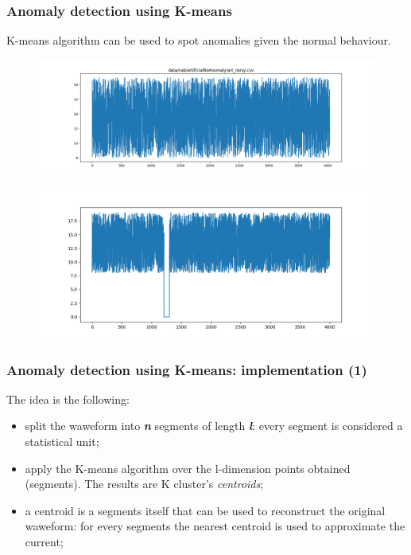 \documentclass[xcolor ={table,usenames,dvipsnames}]{beamer}
\theoremstyle{definition}
\begin{document}
	\begin{frame}[fragile]
		\frametitle{Anomaly detection using K-means}
		K-means algorithm can be used to spot anomalies given the normal behaviour.
			\begin{figure}[]
			\centering
			\includegraphics[scale=0.15]{img/normalbe.png}
		\end{figure}
		
		\begin{figure}[]
			\centering
			\includegraphics[scale=0.20]{img/anomaly.png}
		\end{figure}
	
	\end{frame}

	\begin{frame}
		\frametitle{Anomaly detection using K-means: implementation (1)}
		The idea is the following:
		\begin{itemize}
			\item split the waweform into \textbf{\textit{n}} segments of length \textbf{\textit{l}}: every segment is considered a statistical unit;
			\item apply the K-means algorithm over the l-dimension points obtained (segments). The results are K cluster's \textit{centroids};
			\item a centroid is a segments itself that can be used to reconstruct the original waweform: for every segments the nearest centroid is used to approximate the current;
		\end{itemize}
	\end{frame}
\end{document}
